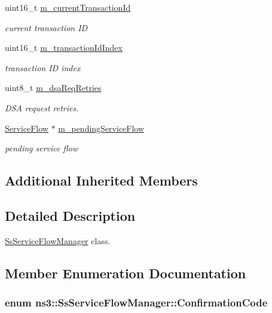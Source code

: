 \begin{DoxyCompactItemize}
uint16\+\_\+t \hyperlink{classns3_1_1SsServiceFlowManager_a0e72fbf3a59c7e080f3b4b5bd709f595}{m\+\_\+current\+Transaction\+Id}
\begin{DoxyCompactList}\small\item\em current transaction ID \end{DoxyCompactList}\item 
uint16\+\_\+t \hyperlink{classns3_1_1SsServiceFlowManager_aa92aebf1cc248c8194b08d3b51e55a6f}{m\+\_\+transaction\+Id\+Index}
\begin{DoxyCompactList}\small\item\em transaction ID index \end{DoxyCompactList}\item 
uint8\+\_\+t \hyperlink{classns3_1_1SsServiceFlowManager_a34c992ad355e2127c4377a62543208d8}{m\+\_\+dsa\+Req\+Retries}
\begin{DoxyCompactList}\small\item\em D\+SA request retries. \end{DoxyCompactList}\item 
\hyperlink{classns3_1_1ServiceFlow}{Service\+Flow} $\ast$ \hyperlink{classns3_1_1SsServiceFlowManager_a3d0897d17b8b4d7fcd703851c6233bbe}{m\+\_\+pending\+Service\+Flow}
\begin{DoxyCompactList}\small\item\em pending service flow \end{DoxyCompactList}\end{DoxyCompactItemize}
\subsection*{Additional Inherited Members}


\subsection{Detailed Description}
\hyperlink{classns3_1_1SsServiceFlowManager}{Ss\+Service\+Flow\+Manager} class. 

\subsection{Member Enumeration Documentation}
\subsubsection[{\texorpdfstring{Confirmation\+Code}{ConfirmationCode}}]{\setlength{\rightskip}{0pt plus 5cm}enum {\bf ns3\+::\+Ss\+Service\+Flow\+Manager\+::\+Confirmation\+Code}}\hypertarget{classns3_1_1SsServiceFlowManager_a51489a5db64b7dba801ece04d3dffe2b}{}\label{classns3_1_1SsServiceFlowManager_a51489a5db64b7dba801ece04d3dffe2b}


